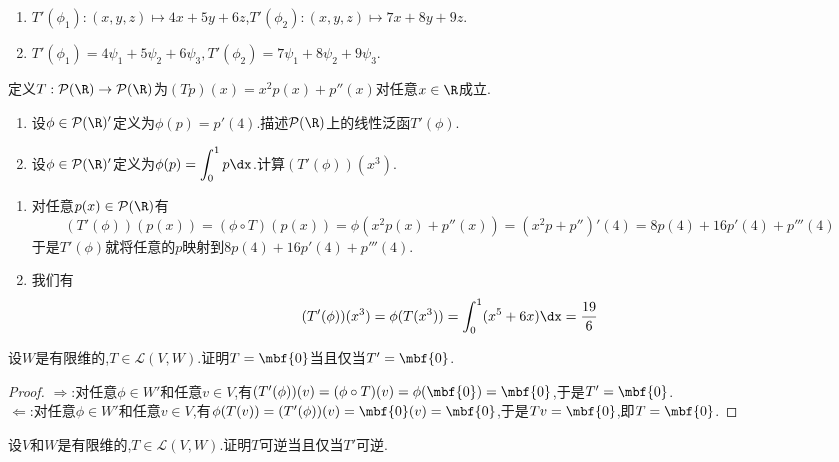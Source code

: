 \documentclass{ctexart}
\begin{document}
\begin{solution}[Solution.]
    \begin{enumerate}[label=\tbf{(\arabic*)}]
        \item $T'(\phi_1):(x,y,z)\mapsto 4x+5y+6z$,$T'(\phi_2):(x,y,z)\mapsto 7x+8y+9z$.
        \item $T'(\phi_1)=4\psi_1+5\psi_2+6\psi_3,T'(\phi_2)=7\psi_1+8\psi_2+9\psi_3$.
    \end{enumerate}
\end{solution}
\begin{problem}[15.]
    定义$T:\mathcal{P}(\R)\to\mathcal{P}(\R)$为$(Tp)(x)=x^2p(x)+p''(x)$对任意$x\in\R$成立.
    \begin{enumerate}[label=\tbf{(\arabic*)}]
        \item 设$\phi\in\mathcal{P}(\R)'$定义为$\phi(p)=p'(4)$.描述$\mathcal{P}(\R)$上的线性泛函$T'(\phi)$.
        \item 设$\phi\in\mathcal{P}(\R)'$定义为$\phi(p)=\displaystyle\int_{0}^{1}p\dx$.计算$(T'(\phi))(x^3)$.
    \end{enumerate}
\end{problem}
\begin{solution}[Solution.]
    \begin{enumerate}[label=\tbf{(\arabic*)}]
        \item 对任意$p(x)\in\mathcal{P}(\R)$有
            $$(T'(\phi))(p(x))=(\phi\circ T)(p(x))=\phi(x^2p(x)+p''(x))=(x^2p+p'')'(4)=8p(4)+16p'(4)+p'''(4)$$
            于是$T'(\phi)$就将任意的$p$映射到$8p(4)+16p'(4)+p'''(4)$.
        \item 我们有
            $$(T'(\phi))(x^3)=\phi(T(x^3))=\int_0^1(x^5+6x)\dx=\dfrac{19}{6}$$
    \end{enumerate}
\end{solution}
\begin{problem}[16.]
    设$W$是有限维的,$T\in\mathcal{L}(V,W)$.证明$T=\mbf{0}$当且仅当$T'=\mbf{0}$.
\end{problem}
\begin{proof}
    $\Rightarrow$:对任意$\phi\in W'$和任意$v\in V$,有$(T'(\phi))(v)=(\phi\circ T)(v)=\phi(\mbf{0})=\mbf{0}$,于是$T'=\mbf{0}$.\\
    $\Leftarrow$:对任意$\phi\in W'$和任意$v\in V$,有$\phi(T(v))=(T'(\phi))(v)=\mbf{0}(v)=\mbf{0}$,于是$Tv=\mbf{0}$,即$T=\mbf{0}$.
\end{proof}
\begin{problem}[17.]
    设$V$和$W$是有限维的,$T\in\mathcal{L}(V,W)$.证明$T$可逆当且仅当$T'$可逆.
\end{problem}
\end{document}
